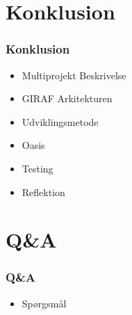 \documentclass{beamer}
\begin{document}
\section{Konklusion}

\begin{frame}
	\frametitle{Konklusion}
	\begin{itemize}
		\item Multiprojekt Beskrivelse
		\item GIRAF Arkitekturen
		\item Udviklingsmetode
		\item Oasis
		\item Testing
		\item Reflektion
	\end{itemize}
\end{frame}

\section{Q\&A}

\begin{frame}
	\frametitle{Q\&A}
	\begin{itemize}
		\item Sp\o{}rgsm\aa{}l
	\end{itemize}
\end{frame}
\end{document}
